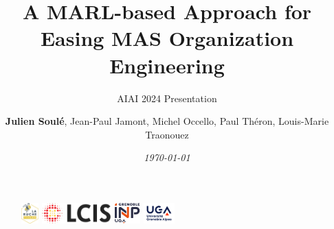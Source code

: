 \author{\textbf{Julien Soulé}, Jean-Paul Jamont, Michel Occello, Paul Théron, Louis-Marie Traonouez}

\title{\textbf{A MARL-based Approach for Easing MAS Organization Engineering}}

\subtitle{AIAI 2024 Presentation}



\date{\textit{\footnotesize \today}}

\begin{frame}[plain]
	\maketitle\vspace{-0.8cm}
	\begin{figure}[ht!]
		\centering
            \includegraphics[height=0.8cm]{figures/la-ruche_logo.png}
            \hspace{0.8cm}
            \includegraphics[height=0.8cm]{figures/lcis_logo.png}
            \hspace{0.8cm}
		\includegraphics[height=0.8cm]{figures/grenoble-inp_logo.png}
            \hspace{0.8cm}
            \includegraphics[height=0.8cm]{figures/uga_logo.jpg}
	\end{figure}
\end{frame}